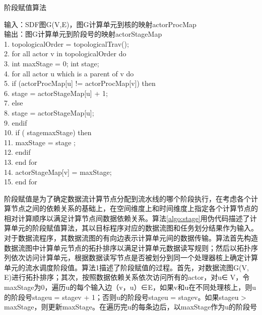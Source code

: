 \begin{algorithm}
  \caption{阶段赋值算法}
  \label{algo:stage}
  输入：SDF图G(V,E)，图G计算单元到核的映射actorProcMap\\
  输出：图G计算单元到阶段号的映射actorStageMap\\
  1.	topologicalOrder = topologicalTrav();\\
  2.	for all actor v in topologicalOrder do\\
  3.	  \hspace*{1 pc} int maxStage = 0; int stage;\\
  4.	  \hspace*{1 pc} for all actor u which is a parent of v do\\
  5.	    \hspace*{2 pc} if (actorProcMap[u] != actorProcMap[v]) then\\
  6.	    \hspace*{3 pc}   stage = actorStageMap[u] + 1;\\
  7.	    \hspace*{2 pc} else\\
  8.	    \hspace*{3 pc}   stage = actorStageMap[u];\\
  9.	    \hspace*{2 pc} endif\\
  10.	    \hspace*{2 pc} if ( stagemaxStage) then\\
  11.	    \hspace*{3 pc}   maxStage = stage ;\\
  12.	    \hspace*{2 pc} endif\\
  13.	  \hspace*{1 pc} end for\\
  14.	  \hspace*{1 pc} actorStageMap[v] = maxStage;\\
  15.	 end for
\end{algorithm}

阶段赋值是为了确定数据流计算节点分配到流水线的哪个阶段执行，在考虑各个计算节点之间的依赖关系的基础上，在空间维度上和时间维度上指定各个计算节点的相对计算顺序以满足计算节点间数据依赖关系。算法\ref{algo:stage}用伪代码描述了计算单元的阶段赋值算法，其以目标程序对应的数据流图和任务划分结果作为输入。对于数据流程序，其数据流图的有向边表示计算单元间的数据传输。算法首先构造数据流图中计算单元节点的拓扑排序以满足计算单元数据读写规则；然后以拓扑序列依次访问计算单元，根据数据读写节点是否被划分到同一个处理器核上确定计算单元的流水调度阶段值。算法1描述了阶段赋值的过程。首先，对数据流图G(V, E)进行拓扑排序；其次，按照数据依赖关系依次访问所有的actor，对u∈ V，令maxStage为0，遍历u的每个输入边（v，u）∈E，如果v和u在不同处理核上，则u的阶段号stageu = stagev + 1；否则u的阶段号stageu = stagev。如果stageu > maxStage，则更新maxStage。在遍历完u的每条边后，以maxStage作为u的阶段号

